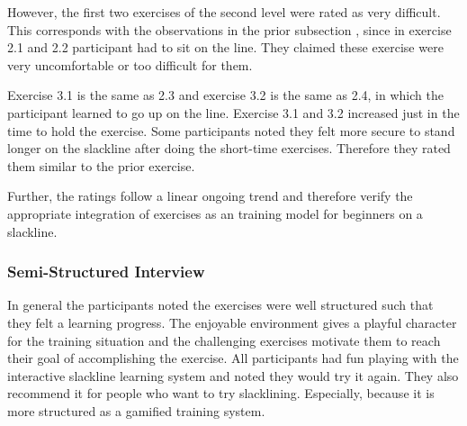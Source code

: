 However, the first two exercises of the second level were rated as very difficult.
This corresponds with the observations in the prior subsection \textit{}, since in exercise 2.1 and 2.2 participant had to sit on the line.
They claimed these exercise were very uncomfortable or too difficult for them.

Exercise 3.1 is the same as 2.3 and exercise 3.2 is the same as 2.4, in which the participant learned to go up on the line.
Exercise 3.1 and 3.2 increased just in the time to hold the exercise.
Some participants noted they felt more secure to stand longer on the slackline after doing the short-time exercises.
Therefore they rated them similar to the prior exercise.

Further, the ratings follow a linear ongoing trend and therefore verify the appropriate integration of exercises as an training model for beginners on a slackline.

\subsubsection{Semi-Structured Interview}
In general the participants noted the exercises were well structured such that they felt a learning progress.
The enjoyable environment gives a playful character for the training situation and the challenging exercises motivate them to reach their goal of accomplishing the exercise.
All participants had fun playing with the interactive slackline learning system and noted they would try it again.
They also recommend it for people who want to try slacklining.
Especially, because it is more structured as a gamified training system.